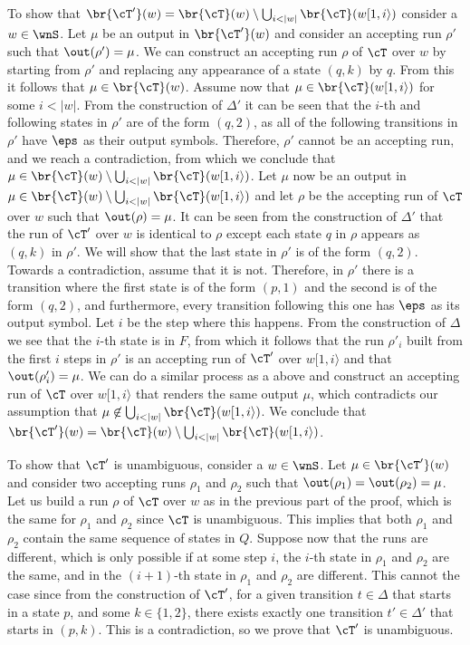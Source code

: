 To show that $\br{\cT'}(w) = \br{\cT}(w) \setminus \bigcup_{i < |w|} \br{\cT}(w[1, i\rangle)$ consider a $w\in \wnS$. Let $\mu$ be an output in $\br{\cT'}(w)$ and consider an accepting run $\rho'$ such that $\out(\rho') = \mu$. We can construct an accepting run $\rho$ of $\cT$ over $w$ by starting from $\rho'$ and replacing any appearance of a state $(q, k)$ by $q$. From this it follows that $\mu \in \br{\cT}(w)$. Assume now that $\mu \in \br{\cT}(w[1, i\rangle)$ for some $i < |w|$. From the construction of $\Delta'$ it can be seen that the $i$-th and following states in $\rho'$ are of the form $(q, 2)$, as all of the following transitions in $\rho'$ have $\eps$ as their output symbols. Therefore, $\rho'$ cannot be an accepting run, and we reach a contradiction, from which we conclude that $\mu \in \br{\cT}(w) \setminus \bigcup_{i < |w|} \br{\cT}(w[1, i\rangle)$. Let $\mu$ now be an output in $\mu \in \br{\cT}(w) \setminus \bigcup_{i < |w|} \br{\cT}(w[1, i\rangle)$ and let $\rho$ be the accepting run of $\cT$ over $w$ such that $\out(\rho) = \mu$. It can be seen from the construction of $\Delta'$ that the run of $\cT'$ over $w$ is identical to $\rho$ except each state $q$ in $\rho$ appears as $(q, k)$ in $\rho'$. We will show that the last state in $\rho'$ is of the form $(q,2)$. Towards a contradiction, assume that it is not. Therefore, in $\rho'$ there is a transition where the first state is of the form $(p,1)$ and the second is of the form $(q,2)$, and furthermore, every transition following this one has $\eps$ as its output symbol. Let $i$ be the step where this happens. From the construction of $\Delta$ we see that the $i$-th state is in $F$, from which it follows that the run $\rho'_i$ built from the first $i$ steps in $\rho'$ is an accepting run of $\cT'$ over $w[1,i\rangle$ and that $\out(\rho'_i) = \mu$. We can do a similar process as a above and construct an accepting run of $\cT$ over $w[1,i\rangle$ that renders the same output $\mu$, which contradicts our assumption that $\mu\not\in\bigcup_{i < |w|} \br{\cT}(w[1, i\rangle)$. We conclude that $\br{\cT'}(w) = \br{\cT}(w) \setminus \bigcup_{i < |w|} \br{\cT}(w[1, i\rangle)$.

To show that $\cT'$ is unambiguous, consider a $w\in \wnS$. Let $\mu \in \br{\cT'}(w)$ and consider two accepting runs $\rho_1$ and $\rho_2$ such that $\out(\rho_1) = \out(\rho_2) = \mu$. Let us build a run $\rho$ of $\cT$ over $w$ as in the previous part of the proof, which is the same for $\rho_1$ and $\rho_2$ since $\cT$ is unambiguous. This implies that both $\rho_1$ and $\rho_2$ contain the same sequence of states in $Q$. Suppose now that the runs are different, which is only possible if at some step $i$, the $i$-th state in $\rho_1$ and $\rho_2$ are the same, and in the $(i+1)$-th state in $\rho_1$ and $\rho_2$ are different. This cannot the case since from the construction of $\cT'$, for a given transition $t\in \Delta$ that starts in a state $p$, and some $k\in\{1, 2\}$, there exists exactly one transition $t'\in\Delta'$ that starts in $(p,k)$. This is a contradiction, so we prove that $\cT'$ is unambiguous.

